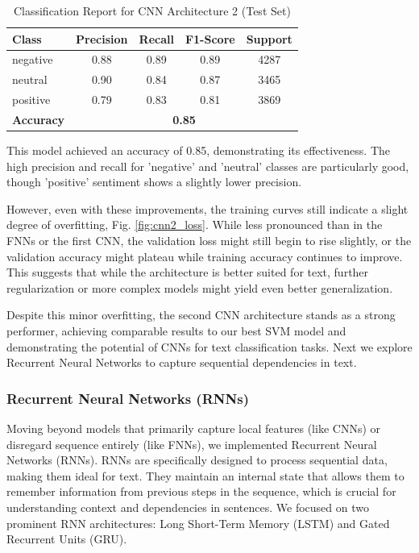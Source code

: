 \begin{table}[H]
\centering
\caption{Classification Report for CNN Architecture 2 (Test Set)}
\begin{tabular}{|l|c|c|c|c|}
\hline
\textbf{Class} & \textbf{Precision} & \textbf{Recall} & \textbf{F1-Score} & \textbf{Support} \\
\hline
negative & 0.88 & 0.89 & 0.89 & 4287 \\
neutral  & 0.90 & 0.84 & 0.87 & 3465 \\
positive & 0.79 & 0.83 & 0.81 & 3869 \\
\hline
\textbf{Accuracy} & \multicolumn{4}{|c|}{\textbf{0.85}} \\
\hline
\end{tabular}
\label{tab:cnn2_classification_report}
\end{table}

This model achieved an accuracy of 0.85, demonstrating its effectiveness. The high precision and recall for 'negative' and 'neutral' classes are particularly good, though 'positive' sentiment shows a slightly lower precision.

However, even with these improvements, the training curves still indicate a slight degree of overfitting, Fig. \ref{fig:cnn2_loss}. While less pronounced than in the FNNs or the first CNN, the validation loss might still begin to rise slightly, or the validation accuracy might plateau while training accuracy continues to improve. This suggests that while the architecture is better suited for text, further regularization or more complex models might yield even better generalization.

Despite this minor overfitting, the second CNN architecture stands as a strong performer, achieving comparable results to our best SVM model and demonstrating the potential of CNNs for text classification tasks. Next we explore Recurrent Neural Networks to capture sequential dependencies in text.


\subsubsection{\textbf{Recurrent Neural Networks (RNNs)}}

Moving beyond models that primarily capture local features (like CNNs) or disregard sequence entirely (like FNNs), we implemented Recurrent Neural Networks (RNNs). RNNs are specifically designed to process sequential data, making them ideal for text. They maintain an internal state that allows them to remember information from previous steps in the sequence, which is crucial for understanding context and dependencies in sentences. We focused on two prominent RNN architectures: Long Short-Term Memory (LSTM) and Gated Recurrent Units (GRU).

